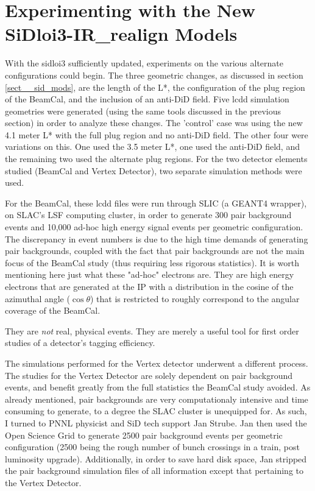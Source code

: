 \documentclass{report}
\begin{document}
        \section{Experimenting with the New SiDloi3-IR\_realign Models}
            With the sidloi3 sufficiently updated, experiments on the various alternate configurations could begin. The three geometric changes, as discussed in section \ref{sect__sid_mods}, are the length of the L*, the configuration of the plug region of the BeamCal, and the inclusion of an anti-DiD field. Five lcdd simulation geometries were generated (using the same tools discussed in the previous section) in order to analyze these changes. The 'control' case was using the new 4.1 meter L* with the full plug region and no anti-DiD field. The other four were variations on this. One used the 3.5 meter L*, one used the anti-DiD field, and the remaining two used the alternate plug regions. For the two detector elements studied (BeamCal and Vertex Detector), two separate simulation methods were used. 

            For the BeamCal, these lcdd files were run through SLIC (a GEANT4 wrapper), on SLAC's LSF computing cluster, in order to generate 300 pair background events and 10,000 ad-hoc high energy signal events per geometric configuration. The discrepancy in event numbers is due to the high time demands of generating pair backgrounds, coupled with the fact that pair backgrounds are not the main focus of the BeamCal study (thus requiring less rigorous statistics). It is worth mentioning here just what these "ad-hoc" electrons are. They are high energy electrons that are generated at the IP with a distribution in the cosine of the azimuthal angle ($\cos\theta$) that is restricted to roughly correspond to the angular coverage of the BeamCal.
            
            They are \textit{not} real, physical events. They are merely a useful tool for first order studies of a detector's tagging efficiency.

            The simulations performed for the Vertex detector underwent a different process. The studies for the Vertex Detector are solely dependent on pair background events, and benefit greatly from the full statistics the BeamCal study avoided. As already mentioned, pair backgrounds are very computationaly intensive and time consuming to generate, to a degree the SLAC cluster is unequipped for. As such, I turned to PNNL physicist and SiD tech support Jan Strube. Jan then used the Open Science Grid to generate 2500 pair background events per geometric configuration (2500 being the rough number of bunch crossings in a train, post luminosity upgrade). Additionally, in order to save hard disk space, Jan stripped the pair background simulation files of all information except that pertaining to the Vertex Detector. 
\end{document}
